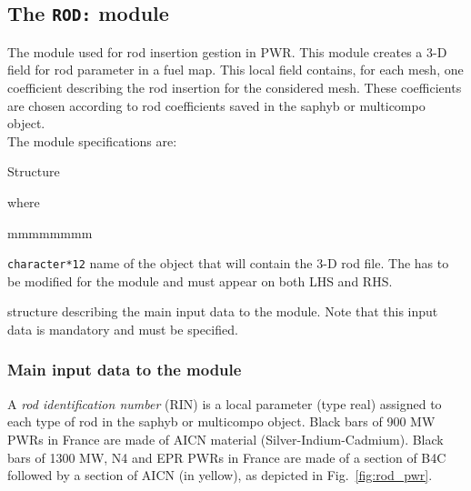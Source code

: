\subsection{The {\tt ROD:} module}\label{sect:RODData}

The  module used for rod insertion gestion in PWR. This module creates a 3-D field for rod parameter in a fuel map. This local field contains, for each mesh, one coefficient describing the rod insertion for the considered mesh. These coefficients are chosen according to rod coefficients saved in the {\sc saphyb} or {\sc multicompo} object.\\

The  module specifications are:

\begin{DataStructure}{Structure }
 \moc{:=}   \moc{::} 
\end{DataStructure}

\noindent where
\begin{ListeDeDescription}{mmmmmmmm}

\item[\dusa{FLMAP}] \texttt{character*12} name of the  object that will contain the 3-D rod file. The  has to be modified for the module and must appear on both LHS and RHS.

\item[\dstr{descrod1}] structure describing the main input data to the  module. Note that this input data is mandatory and must be specified.

\end{ListeDeDescription}

\subsubsection{Main input data to the  module}\label{sect:rodmain}

A {\sl rod identification number} (RIN) is a local parameter (type real) assigned to each type of rod in the {\sc saphyb} or
{\sc multicompo} object. Black bars of 900 MW PWRs in France are made of AICN material (Silver-Indium-Cadmium). Black bars of 1300 MW, N4 and EPR  PWRs in France are made of a section of B4C followed by a section of AICN (in yellow), as depicted in Fig.~\ref{fig:rod_pwr}. 

